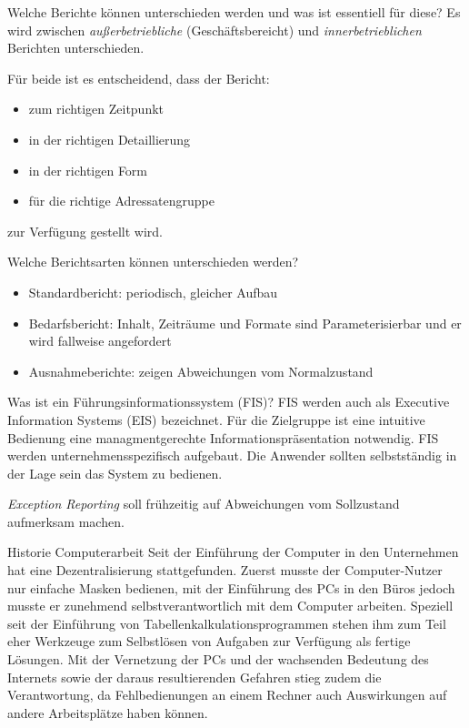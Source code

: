 \documentclass[a6paper,10pt,grid=front%
,toc
]{kartei}
\begin{document}
  \begin{karte}{Welche Berichte können unterschieden werden und was ist essentiell für diese?}  
    Es wird zwischen \textit{außerbetriebliche} (Geschäftsbereicht) und \textit{innerbetrieblichen} Berichten unterschieden.

    Für beide ist es entscheidend, dass der Bericht:

    \begin{itemize}
      \item zum richtigen Zeitpunkt
      \item in der richtigen Detaillierung
      \item in der richtigen Form
      \item für die richtige Adressatengruppe
    \end{itemize}

    zur Verfügung gestellt wird.
  \end{karte}

  \begin{karte}{Welche Berichtsarten können unterschieden werden?}  
        
    \begin{itemize}
      \item Standardbericht: periodisch, gleicher Aufbau
      \item Bedarfsbericht: Inhalt, Zeiträume und Formate sind Parameterisierbar und er wird fallweise angefordert
      \item Ausnahmeberichte: zeigen Abweichungen vom Normalzustand
    \end{itemize}
  \end{karte}

  \begin{karte}{Was ist ein Führungsinformationssystem (FIS)?}  
    FIS werden auch als Executive Information Systems (EIS) bezeichnet. Für die Zielgruppe ist eine intuitive Bedienung eine managmentgerechte Informationspräsentation notwendig. FIS werden unternehmensspezifisch aufgebaut. Die Anwender sollten selbstständig in der Lage sein das System zu bedienen.

    \textit{Exception Reporting} soll frühzeitig auf Abweichungen vom Sollzustand aufmerksam machen.
  \end{karte}

  \begin{karte}{Historie Computerarbeit}  
    Seit der Einführung der Computer in den Unternehmen hat eine Dezentralisierung stattgefunden. Zuerst musste der Computer-Nutzer nur einfache Masken bedienen, mit der Einführung des PCs in den Büros jedoch musste er zunehmend selbstverantwortlich mit dem Computer arbeiten. Speziell seit der Einführung von Tabellenkalkulationsprogrammen stehen ihm zum Teil eher Werkzeuge zum Selbstlösen von Aufgaben zur Verfügung als fertige Lösungen. Mit der Vernetzung der PCs und der wachsenden Bedeutung des Internets sowie der daraus resultierenden Gefahren stieg zudem die Verantwortung, da Fehlbedienungen an einem Rechner auch Auswirkungen auf andere Arbeitsplätze haben können.    
  \end{karte}
\end{document}
